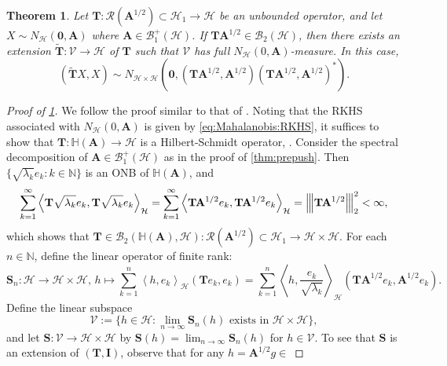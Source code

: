 \documentclass[noinfoline]{imsart}\setcounter{tocdepth}{2}
\renewcommand{\b}[1]{\mathbb{#1}} %
\newcommand{\m}[1]{\mathbf{#1}} %
\renewcommand{\c}[1]{\mathcal{#1}} %
\newcommand{\innpr}[2]{{\left\langle {#1},{#2}\right\rangle}} %
\newcommand{\vertiii}[1]{{\left\vert\kern-0.25ex\left\vert\kern-0.25ex\left\vert #1 
    \right\vert\kern-0.25ex\right\vert\kern-0.25ex\right\vert}} %
\theoremstyle{plain}
\newtheorem{theorem}{Theorem}[section]
\begin{document}
\begin{theorem}\label{thm:wo:closable}
Let $\m{T}: \c{R}(\m{A}^{1/2}) \subset \c{H}_{1} \rightarrow \c{H}$ be an unbounded operator, and let $X \sim N_{\c{H}}(\m{0}, \m{A})$ where $\m{A} \in \c{B}_{1}^{+}(\c{H})$. If $\m{T} \m{A}^{1/2} \in \c{B}_{2}(\c{H})$, then there exists an extension $\tilde{\m{T}} : \c{V} \to \c{H}$ of $\m{T}$ such that $\c{V}$ has full $N_{\c{H}}(0, \m{A})$-measure. In this case,
\begin{equation*}
    (\tilde{\m{T}} X, X) \sim N_{\c{H} \times \c{H}}(\m{0}, (\m{T} \m{A}^{1/2}, \m{A}^{1/2})(\m{T} \m{A}^{1/2}, \m{A}^{1/2})^{*}).
\end{equation*}
\end{theorem}

\begin{proof}[Proof of \cref{thm:wo:closable}]
We follow the proof similar to that of \cite[Theorem 4.47]{hairer2009introduction}. Noting that the RKHS associated with $N_{\c{H}}(0, \m{A})$ is given by \eqref{eq:Mahalanobis:RKHS},
it suffices to show that $\m{T}: \b{H}(\m{A}) \rightarrow \c{H}$ is a Hilbert-Schmidt operator, . Consider the spectral decomposition of $\m{A} \in \c{B}_{1}^{+}(\c{H})$ as in the proof of \cref{thm:prepush}. Then $\{\sqrt{\lambda_{k}} e_{k} : k \in \b{N}\}$ is an ONB of $\b{H}(\m{A})$, and
\begin{align*}
    \sum_{k=1}^{\infty} \innpr{\m{T} \sqrt{\lambda_{k}} e_{k}}{\m{T} \sqrt{\lambda_{k}} e_{k}}_{\c{H}} = \sum_{k=1}^{\infty} \innpr{\m{T} \m{A}^{1/2} e_{k}}{\m{T} \m{A}^{1/2} e_{k}}_{\c{H}} = \vertiii{\m{T} \m{A}^{1/2}}_{2}^{2} < \infty,
\end{align*}
which shows that $\m{T} \in \c{B}_{2}(\b{H}(\m{A}), \c{H}): \c{R}(\m{A}^{1/2}) \subset \c{H}_{1} \rightarrow \c{H} \times \c{H}$. For each $n \in \b{N}$, define the linear operator of finite rank:
\begin{equation*}
    \m{S}_{n} : \c{H} \to \c{H} \times \c{H}, \, h \mapsto \sum_{k=1}^{n} \innpr{h}{e_{k}}_{\c{H}} (\m{T} e_{k}, e_{k}) =  \sum_{k=1}^{n} \innpr{h}{\frac{e_{k}}{\sqrt{\lambda_{k}}}}_{\c{H}} (\m{T} \m{A}^{1/2} e_{k}, \m{A}^{1/2} e_{k}).
\end{equation*}
Define the linear subspace
\begin{equation*}
    \c{V} := \{ h \in \c{H} : \lim_{n \to \infty} \m{S}_{n}(h) \text{ exists in } \c{H} \times \c{H} \},
\end{equation*}
and let $\m{S}: \c{V} \to \c{H} \times \c{H}$ by $\m{S}(h) = \lim_{n \to \infty} \m{S}_{n}(h)$ for $h \in \c{V}$. To see that $\m{S}$ is an extension of $(\m{T}, \m{I})$, observe that for any $h = \m{A}^{1/2} g \in $

\end{proof}
\end{document}
